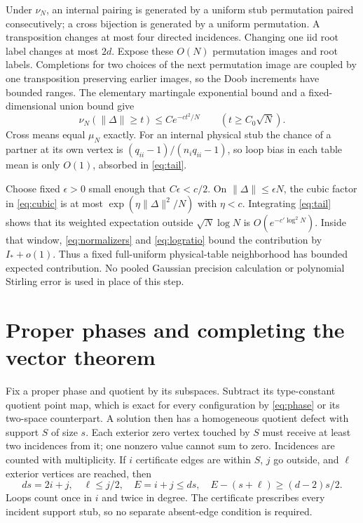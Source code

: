 \documentclass[11pt]{article}
\begin{document}
Under $\nu_N$, an internal pairing is generated by a uniform stub permutation paired consecutively; a cross bijection is generated by a uniform permutation. A transposition changes at most four directed incidences. Changing one iid root label changes at most $2d$. Expose these $O(N)$ permutation images and root labels. Completions for two choices of the next permutation image are coupled by one transposition preserving earlier images, so the Doob increments have bounded ranges. The elementary martingale exponential bound and a fixed-dimensional union bound give
\begin{equation}\label{eq:tail}
 \nu_N(\|\Delta\|\ge t)\le C e^{-ct^2/N}\qquad(t\ge C_0\sqrt N).
\end{equation}
Cross means equal $\mu_N$ exactly. For an internal physical stub the chance of a partner at its own vertex is $(q_{ii}-1)/(n_iq_{ii}-1)$, so loop bias in each table mean is only $O(1)$, absorbed in \eqref{eq:tail}.

Choose fixed $\epsilon>0$ small enough that $C\epsilon<c/2$. On $\|\Delta\|\le\epsilon N$, the cubic factor in \eqref{eq:cubic} is at most $\exp(\eta\|\Delta\|^2/N)$ with $\eta<c$. Integrating \eqref{eq:tail} shows that its weighted expectation outside $\sqrt N\log N$ is $O(e^{-c'\log^2N})$. Inside that window, \eqref{eq:normalizers} and \eqref{eq:logratio} bound the contribution by $I_*+o(1)$. Thus a fixed full-uniform physical-table neighborhood has bounded expected contribution. No pooled Gaussian precision calculation or polynomial Stirling error is used in place of this step.

\section{Proper phases and completing the vector theorem}
Fix a proper phase and quotient by its subspaces. Subtract its type-constant quotient point map, which is exact for every configuration by \eqref{eq:phase} or its two-space counterpart. A solution then has a homogeneous quotient defect with support $S$ of size $s$. Each exterior zero vertex touched by $S$ must receive at least two incidences from it; one nonzero value cannot sum to zero. Incidences are counted with multiplicity. If $i$ certificate edges are within $S$, $j$ go outside, and $\ell$ exterior vertices are reached, then
\[
 ds=2i+j,\quad \ell\le j/2,\quad E=i+j\le ds,
 \quad E-(s+\ell)\ge(d-2)s/2.
\]
Loops count once in $i$ and twice in degree. The certificate prescribes every incident support stub, so no separate absent-edge condition is required.
\end{document}
